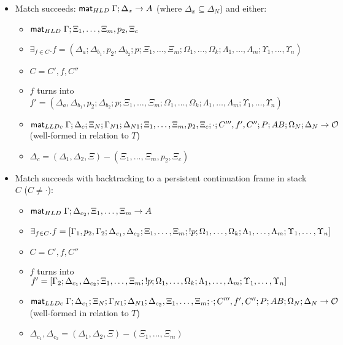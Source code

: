 \begin{lemma}
\begin{itemize}[leftmargin=*]
   \item Match succeeds: $\mathsf{mat}_{HLD} \; \Gamma; \Delta_x \rightarrow A$ (where
         $\Delta_x \subseteq \Delta_N$) and either:
   \begin{itemize}[leftmargin=\secondm]
      \item $\mathsf{mat}_{HLD} \; \Gamma; \Xi_1, \dotsc, \Xi_m, p_2, \Xi_c$
      \item $\exists_{f \in C}. f = (\Delta_a; \Delta_{b_1}, p_2,
            \Delta_{b_2}; p; \Xi_1, \dotsc, \Xi_m; \Omega_1, \dotsc,
            \Omega_k; \Lambda_1, \dotsc, \Lambda_m; \Upsilon_1, \dotsc,
            \Upsilon_n)$
      \item $C = C', f, C''$
      \item $f$ turns into $f' = (\Delta_a, \Delta_{b_1}, p_2;
            \Delta_{b_2}; p; \Xi_1, \dotsc, \Xi_m;
            \Omega_1, \dotsc, \Omega_k; \Lambda_1, \dotsc, \Lambda_m;
            \Upsilon_1, \dotsc, \Upsilon_n)$
      \item $\mathsf{mat}_{LLDc} \; \Gamma; \Delta_c; \Xi_N; \Gamma_{N1}; \Delta_{N1}; \Xi_1,
         \dotsc, \Xi_m, p_2, \Xi_c; \cdot; C''', f', C''; P;
         AB; \Omega_N; \Delta_N \rightarrow \mathcal{O}$ (well-formed in relation to $T$)
      \item $\Delta_c = (\Delta_1, \Delta_2, \Xi) - (\Xi_1, \dotsc, \Xi_m,
            p_2, \Xi_c)$
   \end{itemize}

   \item Match succeeds with backtracking to a persistent continuation frame
   in stack $C$ ($C \neq \cdot$):
   \begin{itemize}[leftmargin=\secondm]
      \item $\mathsf{mat}_{HLD} \; \Gamma; \Delta_{c_2}, \Xi_1, \dotsc, \Xi_m \rightarrow A$
      \item $\exists_{f \in C}. f = [\Gamma_1, p_2, \Gamma_2; \Delta_{c_1},
         \Delta_{c_2}; \Xi_1, \dotsc, \Xi_m; {!} p; \Omega_1, \dotsc, \Omega_k;
         \Lambda_1, \dotsc, \Lambda_m; \Upsilon_1, \dotsc, \Upsilon_n]$
      \item $C = C', f, C''$
      \item $f$ turns into $f' = [\Gamma_2; \Delta_{c_1}, \Delta_{c_2};
         \Xi_1, \dotsc, \Xi_m; {!} p; \Omega_1, \dotsc, \Omega_k; \Lambda_1,
         \dotsc, \Lambda_m; \Upsilon_1, \dotsc, \Upsilon_n]$
      \item $\mathsf{mat}_{LLDc} \; \Gamma; \Delta_{c_1}; \Xi_N; \Gamma_{N1}; \Delta_{N1};
         \Delta_{c_2}, \Xi_1, \dotsc, \Xi_m; \cdot; C''', f', C''; P;
         AB; \Omega_N; \Delta_N \rightarrow \mathcal{O}$ (well-formed in relation to $T$)
      \item $\Delta_{c_1}, \Delta_{c_2} = (\Delta_1, \Delta_2, \Xi) - (\Xi_1, \dotsc, \Xi_m)$
   \end{itemize}


\end{itemize}
\end{lemma}
